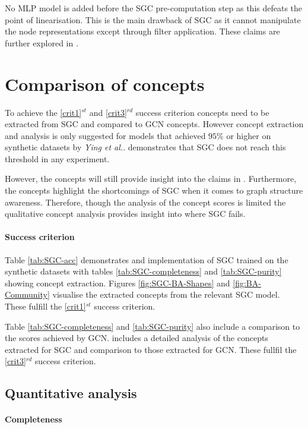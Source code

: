 No MLP model is added before the SGC pre-computation step as this defeats the point of linearisation.
This is the main drawback of SGC as it cannot manipulate the node representations except through filter application.
These claims are further explored in .

\section{Comparison of concepts}
\label{sec:comp-concept}

To achieve the \ref{crit1}$^{st}$ and \ref{crit3}$^{rd}$ success criterion concepts need to be extracted from SGC and compared to GCN concepts.
However concept extraction and analysis is only suggested for models that achieved $95$\% or higher on synthetic datasets by \textit{Ying et al.}\cite{ying2019gnnexplainer}.
 demonstrates that SGC does not reach this threshold in any experiment.

However, the concepts will still provide insight into the claims in .
Furthermore, the concepts highlight the shortcomings of SGC when it comes to graph structure awareness.
Therefore, though the analysis of the concept scores is limited the qualitative concept analysis provides insight into where SGC fails.

\paragraph{Success criterion}
Table \ref{tab:SGC-acc} demonstrates and implementation of SGC trained on the synthetic datasets with tables \ref{tab:SGC-completeness} and \ref{tab:SGC-purity} showing concept extraction.
Figures \ref{fig:SGC-BA-Shapes} and \ref{fig:BA-Community} visualise the extracted concepts from the relevant SGC model. These fulfill the \ref{crit1}$^{st}$ success criterion.

Table \ref{tab:SGC-completeness} and \ref{tab:SGC-purity} also include a comparison to the scores achieved by GCN.
 includes a detailed analysis of the concepts extracted for SGC and comparison to those extracted for GCN.
These fullfil the \ref{crit3}$^{rd}$ success criterion.

\subsection{Quantitative analysis}
\label{sec:quant}
\paragraph{Completeness}


